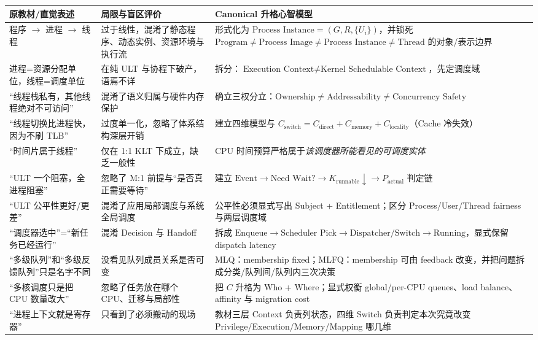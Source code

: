 \documentclass[11pt,a4paper]{ctexart}
\begin{document}
\begingroup
\small
\renewcommand{\arraystretch}{1.22}
\setlength{\tabcolsep}{4pt}
\begin{longtable}{p{}p{}p{}}
\toprule
原教材/直觉表述 & 局限与盲区评价 & Canonical 升格心智模型\\
\midrule
程序 $\to$ 进程 $\to$ 线程 & 过于线性，混淆了静态程序、动态实例、资源环境与执行流 & 形式化为 $\text{Process Instance}=(G,R,\{U_i\})$，并锁死 $\text{Program}\neq\text{Process Image}\neq\text{Process Instance}\neq\text{Thread}$ 的对象/表示边界\\
进程=资源分配单位，线程=调度单位 & 在纯 ULT 与协程下破产，语焉不详 & 拆分：$\text{Execution Context} \neq \text{Kernel Schedulable Context}$，先定调度域\\
“线程栈私有，其他线程绝对不可访问” & 混淆了语义归属与硬件内存保护 & 确立三权分立：$\text{Ownership} \neq \text{Addressability} \neq \text{Concurrency Safety}$\\
“线程切换比进程快，因为不刷 TLB” & 过度单一化，忽略了体系结构深层开销 & 建立四维模型与 $C_{\text{switch}} = C_{\text{direct}} + C_{\text{memory}} + C_{\text{locality}}$（Cache 冷失效）\\
“时间片属于线程” & 仅在 1:1 KLT 下成立，缺乏一般性 & CPU 时间预算严格属于\emph{该调度器所能看见的可调度实体}\\
“ULT 一个阻塞，全进程阻塞” & 忽略了 M:1 前提与“是否真正需要等待” & 建立 $\text{Event} \to \text{Need Wait?} \to K_{\text{runnable}}\downarrow \to P_{\text{actual}}$ 判定链\\
“ULT 公平性更好/更差” & 混淆了应用局部调度与系统全局调度 & 公平性必须显式写出 Subject + Entitlement；区分 Process/User/Thread fairness 与两层调度域\\
“调度器选中”=“新任务已经运行” & 混淆 Decision 与 Handoff & 拆成 $\text{Enqueue}\to\text{Scheduler Pick}\to\text{Dispatcher/Switch}\to\text{Running}$，显式保留 dispatch latency\\
“多级队列”和“多级反馈队列”只是名字不同 & 没看见队列成员关系是否可变 & MLQ：membership fixed；MLFQ：membership 可由 feedback 改变，并把问题拆成分类/队列间/队列内三次决策\\
“多核调度只是把 CPU 数量改大” & 忽略了任务放在哪个 CPU、迁移与局部性 & 把 $C$ 升格为 Who + Where；显式权衡 global/per-CPU queues、load balance、affinity 与 migration cost\\
“进程上下文就是寄存器” & 只看到了必须搬动的现场 & 教材三层 Context 负责列状态，四维 Switch 负责判定本次究竟改变 Privilege/Execution/Memory/Mapping 哪几维\\

\end{longtable}
\end{document}
